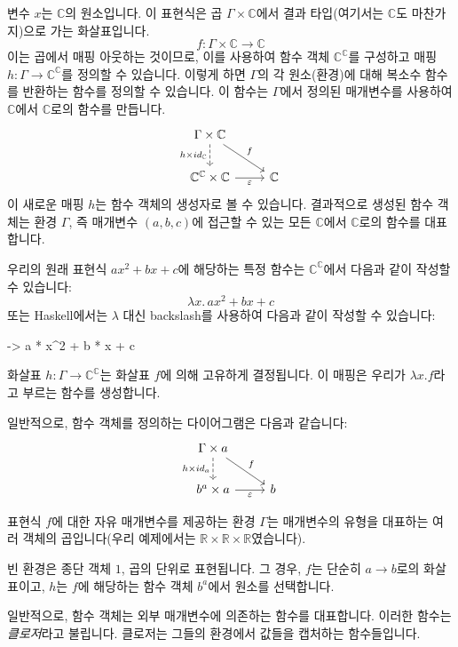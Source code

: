 \documentclass[DaoFP]{subfiles}
\begin{document}
\begin{CJK*}{UTF8}{gbsn}
변수 $x$는 $\mathbb{C}$의 원소입니다. 이 표현식은 곱 $\Gamma \times \mathbb{C}$에서 결과 타입(여기서는 $\mathbb{C}$도 마찬가지)으로 가는 화살표입니다.
\[f \colon \Gamma \times \mathbb{C} \to \mathbb{C} \]
이는 곱에서 매핑 아웃하는 것이므로, 이를 사용하여 함수 객체 $\mathbb{C}^{\mathbb{C}}$를 구성하고 매핑 $h \colon \Gamma \to \mathbb{C}^{\mathbb{C}}$를 정의할 수 있습니다. 이렇게 하면 $\Gamma$의 각 원소(환경)에 대해 복소수 함수를 반환하는 함수를 정의할 수 있습니다. 이 함수는 $\Gamma$에서 정의된 매개변수를 사용하여 $\mathbb{C}$에서 $\mathbb{C}$로의 함수를 만듭니다.
\[
 \begin{tikzcd}
 \Gamma \times \mathbb{C}
 \arrow[d, dashed, "h \times id_{\mathbb{C}}"']
 \arrow[rd, "f"]
 \\
 \mathbb{C}^{\mathbb{C}} \times \mathbb{C}
 \arrow[r, "\varepsilon"']
& \mathbb{C}
 \end{tikzcd}
\]
이 새로운 매핑 $h$는 함수 객체의 생성자로 볼 수 있습니다. 결과적으로 생성된 함수 객체는 환경 $\Gamma$, 즉 매개변수 $(a, b, c)$에 접근할 수 있는 모든 $\mathbb{C}$에서 $\mathbb{C}$로의 함수를 대표합니다.

우리의 원래 표현식 $a x^2 + b x + c$에 해당하는 특정 함수는 $\mathbb{C}^{\mathbb{C}}$에서 다음과 같이 작성할 수 있습니다:
\[  \lambda x . \,a x^2 + b x + c \]
또는 Haskell에서는 $\lambda$ 대신 backslash를 사용하여 다음과 같이 작성할 수 있습니다:
\begin{haskell}
\x -> a * x^2 + b * x + c
\end{haskell}

화살표 $h \colon \Gamma \to \mathbb{C}^{\mathbb{C}}$는 화살표 $f$에 의해 고유하게 결정됩니다. 이 매핑은 우리가 $\lambda x . f$라고 부르는 함수를 생성합니다.

일반적으로, 함수 객체를 정의하는 다이어그램은 다음과 같습니다:
\[
 \begin{tikzcd}
 \Gamma \times a
 \arrow[d, dashed, "{h \times id_a}"']
 \arrow[rd, "f"]
 \\
 b^a \times a
 \arrow[r, "\varepsilon"']
& b
 \end{tikzcd}
\]

표현식 $f$에 대한 자유 매개변수를 제공하는 환경 $\Gamma$는 매개변수의 유형을 대표하는 여러 객체의 곱입니다(우리 예제에서는 $\mathbb{R} \times \mathbb{R} \times \mathbb{R}$였습니다).

빈 환경은 종단 객체 $1$, 곱의 단위로 표현됩니다. 그 경우, $f$는 단순히 $a \to b$로의 화살표이고, $h$는 $f$에 해당하는 함수 객체 $b^a$에서 원소를 선택합니다.

일반적으로, 함수 객체는 외부 매개변수에 의존하는 함수를 대표합니다. 이러한 함수는 \emph{클로저}라고 불립니다. 클로저는 그들의 환경에서 값들을 캡처하는 함수들입니다.


\end{CJK*}
\end{document}
